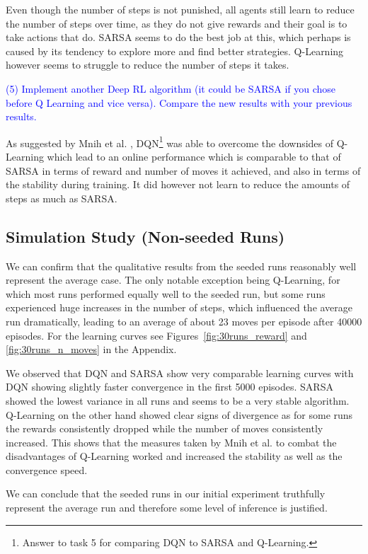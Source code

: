\documentclass[conference]{IEEEtran}
\begin{document}
Even though the number of steps is not punished, all agents still learn to reduce the number of steps over time, as they do not give rewards and their goal is to take actions that do. SARSA seems to do the best job at this, which perhaps is caused by its tendency to explore more and find better strategies. Q-Learning however seems to struggle to reduce the number of steps it takes.


\textcolor{blue}{(5) Implement another Deep RL algorithm (it could be SARSA if you chose before Q
Learning and vice versa). Compare the new results with your previous results.}

As suggested by Mnih et al. \cite{atari2013, dqn2015}, DQN\footnote{Answer to task 5 for comparing DQN to SARSA and Q-Learning.} was able to overcome the downsides of Q-Learning which lead to an online performance which is comparable to that of SARSA in terms of reward and number of moves it achieved, and also in terms of the stability during training. It did however not learn to reduce the amounts of steps as much as SARSA.


\subsection{Simulation Study (Non-seeded Runs)}

We can confirm that the qualitative results from the seeded runs reasonably well represent the average case. The only notable exception being Q-Learning, for which most runs performed equally well to the seeded run, but some runs experienced huge increases in the number of steps, which influenced the average run dramatically, leading to an average of about 23 moves per episode after 40000 episodes. For the learning curves see Figures~\ref{fig:30runs_reward} and \ref{fig:30runs_n_moves} in the Appendix. 

We observed that DQN and SARSA show very comparable learning curves with DQN showing slightly faster convergence in the first 5000 episodes. SARSA showed the lowest variance in all runs and seems to be a very stable algorithm. Q-Learning on the other hand showed clear signs of divergence as for some runs the rewards consistently dropped while the number of moves consistently increased. This shows that the measures taken by Mnih et al. \cite{dqn2015} to combat the disadvantages of Q-Learning worked and increased the stability as well as the convergence speed.

We can conclude that the seeded runs in our initial experiment truthfully represent the average run and therefore some level of inference is justified.
\end{document}
